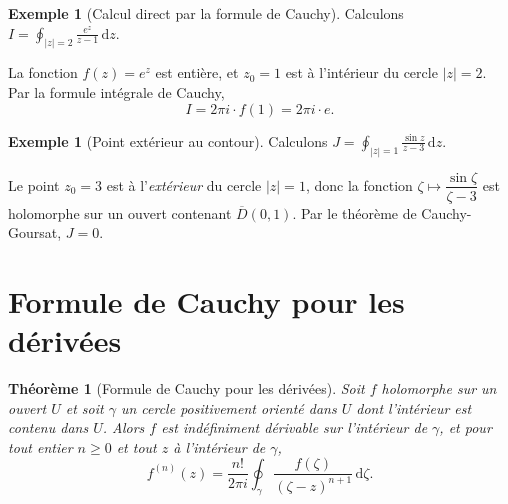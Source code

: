 \documentclass[12pt,a4paper,openany]{book}
\theoremstyle{definition}
\newtheorem{exemple}[definition]{Exemple}
\theoremstyle{plain}
\newtheorem{theoreme}[definition]{Théorème}
\theoremstyle{remark}
\newcommand{\dd}{\mathrm{d}}
\newcommand{\abs}[1]{\left|#1\right|}
\begin{document}
\begin{exemple}[Calcul direct par la formule de Cauchy]\label{ex:cauchy-calc-1}
Calculons $\displaystyle I = \oint_{\abs{z}=2} \frac{e^z}{z-1}\,\dd z$.

La fonction $f(z) = e^z$ est entière, et $z_0 = 1$ est à l'intérieur
du cercle $\abs{z} = 2$. Par la formule intégrale de Cauchy,
\[
  I = 2\pi i \cdot f(1) = 2\pi i \cdot e.
\]
\end{exemple}

\begin{exemple}[Point extérieur au contour]\label{ex:cauchy-calc-2}
Calculons $\displaystyle J = \oint_{\abs{z}=1} \frac{\sin z}{z - 3}\,\dd z$.

Le point $z_0 = 3$ est à l'\emph{extérieur} du cercle $\abs{z}=1$,
donc la fonction $\zeta \mapsto \dfrac{\sin \zeta}{\zeta - 3}$ est
holomorphe sur un ouvert contenant $\overline{D}(0,1)$. Par le
théorème de Cauchy-Goursat, $J = 0$.
\end{exemple}

\section{Formule de Cauchy pour les dérivées}

\begin{theoreme}[Formule de Cauchy pour les dérivées]\label{thm:cauchy-derivatives}
Soit $f$ holomorphe sur un ouvert $U$ et soit $\gamma$ un cercle positivement
orienté dans $U$ dont l'intérieur est contenu dans $U$. Alors $f$ est
indéfiniment dérivable sur l'intérieur de $\gamma$, et pour tout entier
$n \geq 0$ et tout $z$ à l'intérieur de $\gamma$,
\[
  f^{(n)}(z) = \frac{n!}{2\pi i} \oint_\gamma
  \frac{f(\zeta)}{(\zeta - z)^{n+1}}\,\dd\zeta.
\]
\end{theoreme}
\end{document}
